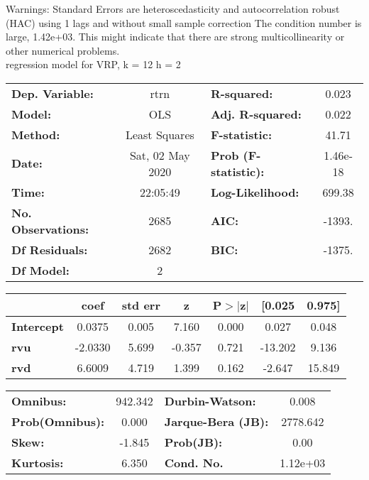 Warnings: \newline
 [1] Standard Errors are heteroscedasticity and autocorrelation robust (HAC) using 1 lags and without small sample correction \newline
 [2] The condition number is large, 1.42e+03. This might indicate that there are \newline
 strong multicollinearity or other numerical problems.\\ 

regression model for VRP, k = 12 h = 2\begin{center}
\begin{tabular}{lclc}
\toprule
\textbf{Dep. Variable:}    &       rtrn       & \textbf{  R-squared:         } &     0.023   \\
\textbf{Model:}            &       OLS        & \textbf{  Adj. R-squared:    } &     0.022   \\
\textbf{Method:}           &  Least Squares   & \textbf{  F-statistic:       } &     41.71   \\
\textbf{Date:}             & Sat, 02 May 2020 & \textbf{  Prob (F-statistic):} &  1.46e-18   \\
\textbf{Time:}             &     22:05:49     & \textbf{  Log-Likelihood:    } &    699.38   \\
\textbf{No. Observations:} &        2685      & \textbf{  AIC:               } &    -1393.   \\
\textbf{Df Residuals:}     &        2682      & \textbf{  BIC:               } &    -1375.   \\
\textbf{Df Model:}         &           2      & \textbf{                     } &             \\
\bottomrule
\end{tabular}
\begin{tabular}{lcccccc}
                   & \textbf{coef} & \textbf{std err} & \textbf{z} & \textbf{P$> |$z$|$} & \textbf{[0.025} & \textbf{0.975]}  \\
\midrule
\textbf{Intercept} &       0.0375  &        0.005     &     7.160  &         0.000        &        0.027    &        0.048     \\
\textbf{rvu}       &      -2.0330  &        5.699     &    -0.357  &         0.721        &      -13.202    &        9.136     \\
\textbf{rvd}       &       6.6009  &        4.719     &     1.399  &         0.162        &       -2.647    &       15.849     \\
\bottomrule
\end{tabular}
\begin{tabular}{lclc}
\textbf{Omnibus:}       & 942.342 & \textbf{  Durbin-Watson:     } &    0.008  \\
\textbf{Prob(Omnibus):} &   0.000 & \textbf{  Jarque-Bera (JB):  } & 2778.642  \\
\textbf{Skew:}          &  -1.845 & \textbf{  Prob(JB):          } &     0.00  \\
\textbf{Kurtosis:}      &   6.350 & \textbf{  Cond. No.          } & 1.12e+03  \\
\bottomrule
\end{tabular}
\end{center}


